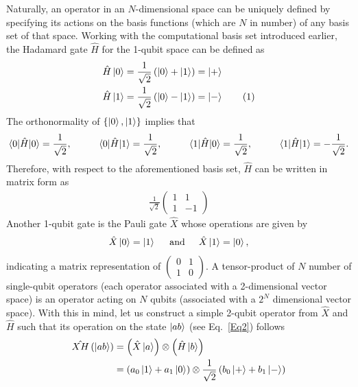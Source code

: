 \documentclass[12pt,oneside]{book}
\newcommand\numberthis{\addtocounter{equation}{1}\tag{\theequation}}
\begin{document}
Naturally, an operator in an $N$-dimensional space can be uniquely defined by specifying its actions on the basis functions (which are $N$ in number) of any basis set of that space. Working with the computational basis set introduced earlier, the Hadamard gate $\hat{H}$ for the 1-qubit space can be defined as
\begin{align*}\label{Hadamard}
    \hat{H}\ket{0} &{}= \frac{1}{\sqrt{2}}\left(\ket{0}+\ket{1}\right) = \ket{+}\\
    \hat{H}\ket{1} &{}= \frac{1}{\sqrt{2}}\left(\ket{0}-\ket{1}\right) = \ket{-}\numberthis
\end{align*}
The orthonormality of $\{\ket{0},\ket{1}\}$ implies that
\begin{align*}
    \braket{0|\hat{H}|0}=\frac{1}{\sqrt{2}}, \hspace{1cm} \braket{0|\hat{H}|1}=\frac{1}{\sqrt{2}}, \hspace{1cm} \braket{1|\hat{H}|0}=\frac{1}{\sqrt{2}}, \hspace{1cm}
    \braket{1|\hat{H}|1}=-\frac{1}{\sqrt{2}}.
\end{align*}
Therefore, with respect to the aforementioned basis set, $\hat{H}$ can be written in matrix form as
\begin{align}
    \frac{1}{\sqrt{2}}\begin{pmatrix}
        1 & 1\\ 1 & -1
    \end{pmatrix}
\end{align}
Another 1-qubit gate is the Pauli gate $\hat{X}$ whose operations are given by
\begin{align*}
    \hat{X}\ket{0} = \ket{1} \hspace{0.5cm} \mathrm{and} \hspace{0.5cm} \hat{X}\ket{1}=\ket{0},
\end{align*}
indicating a matrix representation of $\begin{pmatrix}
    0 & 1\\ 1 & 0
\end{pmatrix}$.
A tensor-product of $N$ number of single-qubit operators (each operator associated with a 2-dimensional vector space) is an operator acting on $N$ qubits (associated with a $2^N$ dimensional vector space). With this in mind, let us construct a simple 2-qubit operator from $\hat{X}$ and $\hat{H}$ such that its operation on the state $\ket{ab}$ (see Eq.~\ref{Eq2}) follows
\begin{align}
\hat{XH}\left(\ket{ab}\right)&{}=\left(\hat{X}\ket{a}\right)\otimes\left(\hat{H}\ket{b}\right)\\
&{}=\left(a_0\ket{1}+a_1\ket{0}\right) \otimes \frac{1}{\sqrt{2}} \left(b_0\ket{+}+b_1\ket{-}\right)
\end{align}
\end{document}

